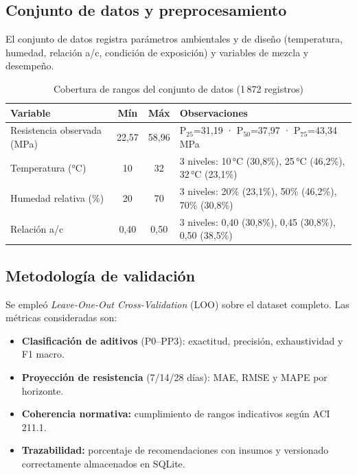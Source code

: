 \documentclass[12pt, letterpaper]{article}
\begin{document}
\subsection{Conjunto de datos y preprocesamiento}

El conjunto de datos registra parámetros ambientales y de diseño (temperatura, humedad, relación a/c, condición de exposición) y variables de mezcla y desempeño.

\begin{table}[H]
  \centering
  \caption{Cobertura de rangos del conjunto de datos (1\,872 registros)}
  \begin{tabular}{lccp{5.5cm}}
    \hline
    Variable & Mín & Máx & Observaciones \\
    \hline
    Resistencia observada (MPa) & 22{,}57 & 58{,}96 & P$_{25}$=31{,}19 · P$_{50}$=37{,}97 · P$_{75}$=43{,}34 MPa \\
    Temperatura (°C) & 10 & 32 & 3 niveles: 10\,°C (30{,}8\%), 25\,°C (46{,}2\%), 32\,°C (23{,}1\%) \\
    Humedad relativa (\%) & 20 & 70 & 3 niveles: 20\% (23{,}1\%), 50\% (46{,}2\%), 70\% (30{,}8\%) \\
    Relación a/c & 0{,}40 & 0{,}50 & 3 niveles: 0{,}40 (30{,}8\%), 0{,}45 (30{,}8\%), 0{,}50 (38{,}5\%) \\
    \hline
  \end{tabular}
\end{table}

\subsection{Metodología de validación}

Se empleó \textit{Leave-One-Out Cross-Validation} (LOO) sobre el dataset completo. Las métricas consideradas son:
\begin{itemize}
  \item \textbf{Clasificación de aditivos} (P0--PP3): exactitud, precisión, exhaustividad y F1 macro.
  \item \textbf{Proyección de resistencia} (7/14/28 días): MAE, RMSE y MAPE por horizonte.
  \item \textbf{Coherencia normativa:} cumplimiento de rangos indicativos según ACI\,211.1.
  \item \textbf{Trazabilidad:} porcentaje de recomendaciones con insumos y versionado correctamente almacenados en SQLite.
\end{itemize}
\end{document}
